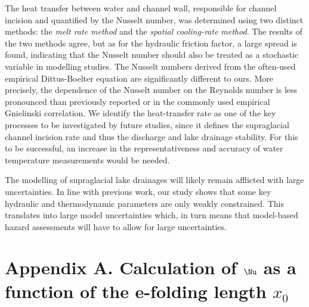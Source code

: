 The heat transfer between water and channel wall, responsible for channel incision and quantified by the Nusselt number, was determined using two distinct methods: the \textit{melt rate method} and the \textit{spatial cooling-rate method}. The results of the two methods agree, but as for the hydraulic friction factor, a large spread is found, indicating that the Nusselt number should also be treated as a stochastic variable in modelling studies.
%
The Nusselt numbers derived from the often-used empirical Dittus-Boelter equation are significantly different to ours. More precisely, the dependence of the Nusselt number on the Reynolds number is less pronounced than previously reported \citep[e.g.][]{Clarke2003,Lunardini&al1986, Vincent&al2010} or in the commonly used empirical Gnielinski correlation.
%
We identify the heat-transfer rate as one of the key processes to be investigated by future studies, since it defines the supraglacial channel incision rate and thus the discharge and lake drainage stability. For this to be successful, an increase in the representativeness and accuracy of water temperature measurements would be needed.

The modelling of supraglacial lake drainages will likely remain afflicted with large uncertainties. In line with previous work, our study shows that some key hydraulic and thermodynamic parameters are only weakly constrained. This translates into large model uncertainties which, in turn means that model-based hazard assessments will have to allow for large uncertainties.

\section{Appendix A. Calculation of $\Nu$ as a function of the e-folding length $x_0$}
\label{sec:appendixA}

